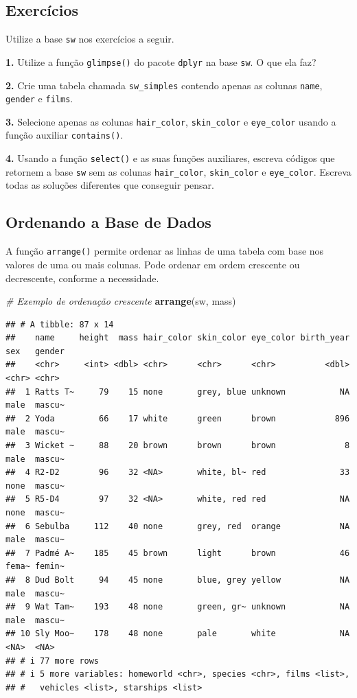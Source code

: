 \documentclass[
]{book}
\newenvironment{Shaded}{\begin{snugshade}}{\end{snugshade}}
\newcommand{\CommentTok}[1]{\textcolor[rgb]{0.56,0.35,0.01}{\textit{#1}}}
\newcommand{\FunctionTok}[1]{\textcolor[rgb]{0.13,0.29,0.53}{\textbf{#1}}}
\newcommand{\NormalTok}[1]{#1}
\begin{document}
\subsection{Exercícios}\label{exercuxedcios-14}

Utilize a base \texttt{sw} nos exercícios a seguir.

\textbf{1.} Utilize a função \texttt{glimpse()} do pacote \texttt{dplyr} na base \texttt{sw}. O
que ela faz?

\textbf{2.} Crie uma tabela chamada \texttt{sw\_simples} contendo apenas as colunas
\texttt{name}, \texttt{gender} e \texttt{films}.

\textbf{3.} Selecione apenas as colunas \texttt{hair\_color}, \texttt{skin\_color} e
\texttt{eye\_color} usando a função auxiliar \texttt{contains()}.

\textbf{4.} Usando a função \texttt{select()} e as suas funções auxiliares, escreva
códigos que retornem a base \texttt{sw} sem as colunas \texttt{hair\_color},
\texttt{skin\_color} e \texttt{eye\_color}. Escreva todas as soluções diferentes que
conseguir pensar.

\subsection{Ordenando a Base de Dados}\label{ordenando-a-base-de-dados}

A função \texttt{arrange()} permite ordenar as linhas de uma tabela com base
nos valores de uma ou mais colunas. Pode ordenar em ordem crescente ou
decrescente, conforme a necessidade.

\begin{Shaded}
\begin{Highlighting}[]
\CommentTok{\# Exemplo de ordenação crescente}
\FunctionTok{arrange}\NormalTok{(sw, mass)}
\end{Highlighting}
\end{Shaded}

\begin{verbatim}
## # A tibble: 87 x 14
##    name     height  mass hair_color skin_color eye_color birth_year sex   gender
##    <chr>     <int> <dbl> <chr>      <chr>      <chr>          <dbl> <chr> <chr> 
##  1 Ratts T~     79    15 none       grey, blue unknown           NA male  mascu~
##  2 Yoda         66    17 white      green      brown            896 male  mascu~
##  3 Wicket ~     88    20 brown      brown      brown              8 male  mascu~
##  4 R2-D2        96    32 <NA>       white, bl~ red               33 none  mascu~
##  5 R5-D4        97    32 <NA>       white, red red               NA none  mascu~
##  6 Sebulba     112    40 none       grey, red  orange            NA male  mascu~
##  7 Padmé A~    185    45 brown      light      brown             46 fema~ femin~
##  8 Dud Bolt     94    45 none       blue, grey yellow            NA male  mascu~
##  9 Wat Tam~    193    48 none       green, gr~ unknown           NA male  mascu~
## 10 Sly Moo~    178    48 none       pale       white             NA <NA>  <NA>  
## # i 77 more rows
## # i 5 more variables: homeworld <chr>, species <chr>, films <list>,
## #   vehicles <list>, starships <list>
\end{verbatim}
\end{document}
